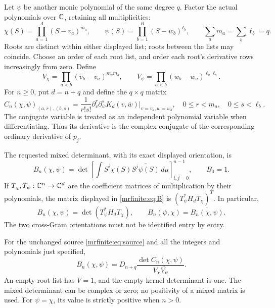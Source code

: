 Let \(\psi\) be another monic polynomial of the same degree \(q\).
Factor the actual polynomials over \(\mathbb C\), retaining all multiplicities:
\[
 \chi(S)=\prod_{a=1}^{A}(S-v_a)^{m_a},\qquad
 \psi(S)=\prod_{b=1}^{B}(S-w_b)^{\ell_b},\qquad
 \sum_a m_a=\sum_b\ell_b=q.
\]
Roots are distinct within either displayed list; roots between the lists
may coincide. Choose an order of each root list, and order each root's
derivative rows increasingly from zero. Define
\begin{equation}\label{mrfinite:eq:V}
 V_\chi=\prod_{a<b}(v_b-v_a)^{m_am_b},\qquad
 V_\psi=\prod_{a<b}(w_b-w_a)^{\ell_a\ell_b}.
\end{equation}
For \(n\geq0\), put \(d=n+q\) and define the \(q\times q\) matrix
\begin{equation}\label{mrfinite:eq:C}
 C_n(\chi,\psi)_{(a,r),(b,s)}
  =\frac{1}{r!s!}
     \partial_v^r\partial_{\overline w}^{s}
           K_d(v,\overline w)\big|_{v=v_a,w=w_b},
 \quad 0\leq r<m_a,\quad0\leq s<\ell_b.
\end{equation}
The conjugate variable is treated as an independent polynomial variable
when differentiating. Thus its derivative is the complex conjugate of
the corresponding ordinary derivative of \(p_j\).

The requested mixed determinant, with its exact displayed orientation,
is
\begin{equation}\label{mrfinite:eq:B}
 B_n(\chi,\psi)=
 \det\left[\int S^i\chi(S)\overline{S^j\psi(S)}\,d\mu\right]_{i,j=0}^{n-1},
 \qquad B_0=1.
\end{equation}
If \(T_\chi,T_\psi:\mathbb C^n\to\mathbb C^d\) are the coefficient matrices of
multiplication by their polynomials, the matrix displayed in
\eqref{mrfinite:eq:B} is \((T_\psi^*H_dT_\chi)^T\). In particular,
\begin{equation}\label{mrfinite:eq:B-orientation}
 B_n(\chi,\psi)=\det(T_\psi^*H_dT_\chi),\qquad
 B_n(\psi,\chi)=\overline{B_n(\chi,\psi)}.
\end{equation}
The two cross-Gram orientations must not be identified entry by entry.

\begin{mrfinitetheorem}\label{mrfinite:thm:mixed}
For the unchanged source \eqref{mrfinite:eq:source} and all the integers and
polynomials just specified,
\begin{equation}\label{mrfinite:eq:main}
 \boxed{B_n(\chi,\psi)
   =D_{n+q}\frac{\det C_n(\chi,\psi)}{V_\chi\overline{V_\psi}}.}
\end{equation}
An empty root list has \(V=1\), and the empty kernel determinant is one.
The mixed determinant can be complex or zero; no positivity of a mixed
matrix is used. For \(\psi=\chi\), its value is strictly positive when
\(n>0\).
\end{mrfinitetheorem}

